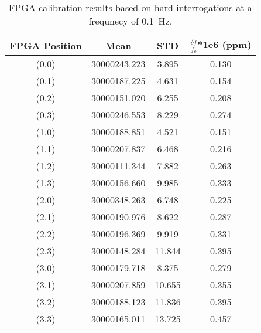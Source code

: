 \begin{table}
	\begin{center}
		\begin{tabular}{|c|c|c|c|}
			\hline
			FPGA Position & Mean & STD & $\frac{\delta f}{f_{o}}$*1e6 (ppm) \\
			\hline
			(0,0) & 30000243.223 & 3.895 & 0.130 \\
			\hline
			(0,1) & 30000187.225 & 4.631 & 0.154 \\
			\hline
			(0,2) & 30000151.020 & 6.255 & 0.208 \\
			\hline
			(0,3) & 30000246.553 & 8.229 & 0.274 \\
			\hline
			(1,0) & 30000188.851 & 4.521 & 0.151 \\
			\hline
			(1,1) & 30000207.837 & 6.468 & 0.216 \\
			\hline
			(1,2) & 30000111.344 & 7.882 & 0.263 \\
			\hline
			(1,3) & 30000156.660 & 9.985 & 0.333 \\
			\hline
			(2,0) & 30000348.263 & 6.748 & 0.225 \\
			\hline
			(2,1) & 30000190.976 & 8.622 & 0.287 \\
			\hline
			(2,2) & 30000196.369 & 9.919 & 0.331 \\
			\hline
			(2,3) & 30000148.284 & 11.844 & 0.395 \\
			\hline
			(3,0) & 30000179.718 & 8.375 & 0.279 \\
			\hline
			(3,1) & 30000207.859 & 10.655 & 0.355 \\
			\hline
			(3,2) & 30000188.123 & 11.836 & 0.395 \\
			\hline
			(3,3) & 30000165.011 & 13.725 & 0.457 \\
			\hline
		\end{tabular}
	\end{center}
	\caption{FPGA calibration results based on hard interrogations at a frequnecy of 0.1~\unit{Hz}.}
	\label{tab:fpga_slow_calibration}
\end{table}